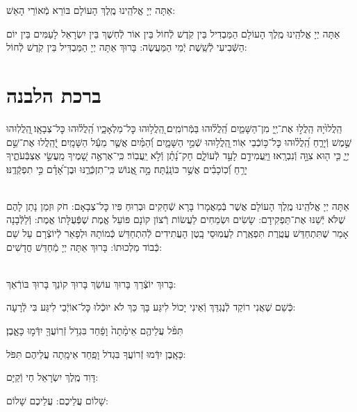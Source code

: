 \documentclass[twoside, openany, parskip=half, 11pt]{book}
\begin{document}
אַתָּה יְיָ אֱלֹהֵֽינוּ מֶֽלֶךְ הָעוֹלָם בּוֹרֵא מְֿאוֹרֵי הָאֵשׁ:

אַתָּה יְיָ אֱלֹהֵֽינוּ מֶֽלֶךְ הָעוֹלָם הַמַּבְדִיל בֵּין קֹֽדֶשׁ לְֿחוֹל בֵּין אוֹר לְֿחֽשֶׁךְ בֵּין יִשְׂרָאֵל לָעַמִּים בֵּין יוֹם הַשְּֿׁבִיעִי לְֿשֵֽׁשֶׁת יְֿמֵי הַמַּעֲשֶׂה: בָּרוּךְ אַתָּה יְיָ הַמַּבְדִּיל בֵּין קֹֽדֶשׁ לְֿחוֹל:
\clearpage

\vspace{-1.3\baselineskip}
\section[ברכת הלבנה]{ ברכת הלבנה }

הַֽלֲלוּ֙יָהּ הַֽלֲל֣וּ אֶת־יְ֖יָ מִן־הַשָּׁמַ֑יִם הַֽ֝לֲל֗וּהוּ בַּמְּֿרוֹמִֽים׃
֭הַֽלֲל֥וּהוּ כׇּל־מַלְאָכָ֑יו הַֽ֝לֲל֗וּהוּ כׇּל־צְבָאָֽו׃
֖הַֽלֲלֽוּהוּ שֶׁ֣מֶשׁ וְֿיָרֵ֑חַ הַֽ֝לֲל֗וּהוּ כׇּל־כּ֥וֹכְֿבֵי אֽוֹר׃
֖הַֽלֲל֥וּהוּ שְֿׁמֵ֣י הַשָּׁמָ֑יִם וְֿ֝הַמַּ֗יִם אֲשֶׁ֤ר מֵעַ֬ל הַשָּׁמָֽיִם׃
יְֿ֭הַֽלֲלוּ אֶת־שֵׁ֣ם יְיָ֑ כִּ֤י ה֖וּא צִוָּ֣ה וְֿנִבְרָֽאוּ׃
וַיַּֽעֲמִידֵ֣ם לָעַ֣ד לְֿעוֹלָ֑ם חָק־נָ֝תַ֗ן וְֿלֹ֣א יַֽעֲבֽוֹר׃
כִּֽי־אֶרְאֶ֣ה שָׁ֭מֶיךָ מַֽעֲשֵׂ֣י אֶצְבְּֿעֹתֶ֑יךָ יָרֵ֥חַ וְֿ֝כֽוֹכָבִ֗ים אֲשֶׁ֣ר כּוֹנָֽנְֿתָּה׃
מָ֣ה אֱ֭נוֹשׁ כִּֽי־תִזְכְּֿרֶ֑נּוּ וּבֶן־אָ֝דָ֗ם כִּ֣י תִפְקְֿדֶֽנּוּ׃

\\
אַתָּה יְיָ אֱלֹהֵֽינוּ מֶֽלֶךְ הָעוֹלָם אֲשֶׁר בְּֿמַאֲמָרוֹ בָּרָא שְֿׁחָקִים וּבְרֽוּחַ פִּיו כׇּל־צְבָאָם: חֹק וּזְמַן נָתַן לָהֶם שֶׁלֹּא יְֿשַׁנּוּ אֶת־תַּפְקִידָם: שָׂשִׂים וּשְׂמֵחִים לַעֲשׂוֹת רְֿצוֹן קוֹנָם פּוֹעֵל אֱמֶת שֶׁפְּֿעֻלָּתוֹ אֱמֶת: וְֿלַלְּֿבָנָה אָמַר שֶׁתִּתְחַדֵּשׁ עֲטֶֽרֶת תִּפְאֶֽרֶת לַעֲמֽוּסֵי בָֽטֶן הָעֲתִידִים לְֿהִתְחַדֵּשׁ כְּֿמוֹתָהּ וּלְפָאֵר לְֿיוֹצְֿרָם עַל שֵׁם כְּֿבוֹד מַלְכוּתוֹ: בָּרוּךְ אַתָּה יְיָ מְֿחַדֵּשׁ חֳדָשִׁים:

\\
בָּרוּךְ יוֹצְֿרֵךְ בָּרוּךְ עוֹשֵׂךְ בָּרוּךְ קוֹנֵךְ בָּרוּךְ בּוֹרְֿאֵךְ:

כְּֿשֵׁם שֶׁאֲנִי רוֹקֵד לְֿנֶגְדֵּךְ וְֿאֵינִי יָכוֹל לִיגַּע בָּךְ
כַּךְ לֹא יוּכְֿלוּ כׇּל־אוֹיְֿבַי לִיגַּע בִּי לְֿרָעָה:

תִּפֹּ֨ל עֲלֵיהֶ֤ם אֵימָ֨תָה֙ וָפַ֔חַד בִּגְדֹ֥ל זְֿרֽוֹעֲךָ֖ יִדְּֿמ֣וּ כָּאָ֑בֶן׃


כָּאָֽבֶן יִדְּֿמוּ זְֿרוֹעֲךָ בִּגְדֹל וָפַֽחַד אֵימָֽתָה עֲלֵיהֶם תִּפֹּל:


דָּוִד מֶֽלֶךְ יִשְׂרָאֵל חַי וְֿקַיָּם:

שָׁלוֹם עֲלֵיכֶם: \qquad {}
עֲלֵיכֶם שָׁלוֹם:
\end{document}
